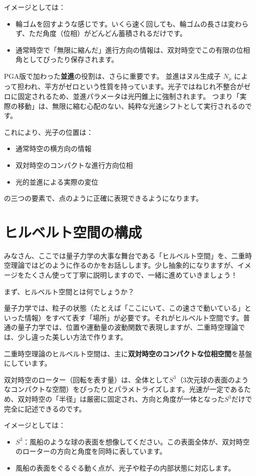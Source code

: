 \documentclass[dvipdfmx,a4paper,oneside]{jsbook}
\begin{document}
イメージとしては：
\begin{itemize}
  \item 輪ゴムを回すような感じです。いくら速く回しても、輪ゴムの長さは変わらず、ただ角度（位相）がどんどん蓄積されるだけです。
  \item 通常時空で「無限に縮んだ」進行方向の情報は、双対時空でこの有限の位相角としてぴったり保存されます。
\end{itemize}

PGA版で加わった\textbf{並進}の役割は、さらに重要です。  
並進はヌル生成子 \(N_\mu\) によって担われ、平方がゼロという性質を持っています。光子ではねじれ不整合がゼロに固定されるため、並進パラメータは光円錐上に強制されます。  
つまり「実際の移動」は、無限に縮む心配のない、純粋な光速シフトとして実行されるのです。

これにより、光子の位置は：
\begin{itemize}
  \item 通常時空の横方向の情報
  \item 双対時空のコンパクトな進行方向位相
  \item 光的並進による実際の変位
\end{itemize}
の三つの要素で、点のように正確に表現できるようになります。

\section{ヒルベルト空間の構成}

みなさん、ここでは量子力学の大事な舞台である「ヒルベルト空間」を、二重時空理論ではどのように作るのかをお話しします。少し抽象的になりますが、イメージをたくさん使って丁寧に説明しますので、一緒に進めていきましょう！

まず、ヒルベルト空間とは何でしょうか？

量子力学では、粒子の状態（たとえば「ここにいて、この速さで動いている」といった情報）をすべて表す「場所」が必要です。それがヒルベルト空間です。普通の量子力学では、位置や運動量の波動関数で表現しますが、二重時空理論では、少し違った美しい方法で作ります。

二重時空理論のヒルベルト空間は、主に\textbf{双対時空のコンパクトな位相空間}を基盤にしています。

双対時空のローター（回転を表す量）は、全体として\(S^3\)（3次元球の表面のようなコンパクトな空間）をぴったりとパラメトライズします。光速が一定であるため、双対時空の「半径」は厳密に固定され、方向と角度が一体となった\(S^3\)だけで完全に記述できるのです。

イメージとしては：
\begin{itemize}
  \item \(S^3\)：風船のような球の表面を想像してください。この表面全体が、双対時空のローターの方向と角度を同時に表しています。
  \item 風船の表面をぐるぐる動く点が、光子や粒子の内部状態に対応します。
\end{itemize}
\end{document}
